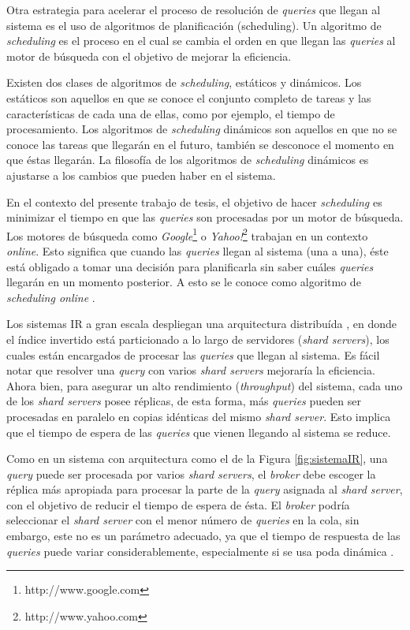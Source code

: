 Otra estrategia para acelerar el proceso de resolución de \textit{queries} que llegan al sistema es el uso de algoritmos de planificación (scheduling). Un algoritmo de \textit{scheduling} es el proceso en el cual se cambia el orden en que llegan las \textit{queries} al motor de búsqueda con el objetivo de mejorar la eficiencia. 

Existen dos clases de algoritmos de \textit{scheduling}, estáticos y dinámicos. Los estáticos son aquellos en que se conoce el conjunto completo de tareas y las características de cada una de ellas, como por ejemplo, el tiempo de procesamiento. Los algoritmos de \textit{scheduling} dinámicos son aquellos en que no se conoce las tareas que llegarán en el futuro, también se desconoce el momento en que éstas llegarán. La filosofía de los algoritmos de \textit{scheduling} dinámicos es ajustarse a los cambios que pueden haber en el sistema.

En el contexto del presente trabajo de tesis, el objetivo de hacer \textit{scheduling} es minimizar el tiempo en que las \textit{queries} son procesadas por un motor de búsqueda. Los motores de búsqueda como \textit{Google}\footnote{http://www.google.com} o \textit{Yahoo!}\footnote{http://www.yahoo.com} trabajan en un contexto \textit{online}. Esto significa que cuando las \textit{queries} llegan al sistema (una a una), éste está obligado a tomar una decisión para planificarla sin saber cuáles \textit{queries} llegarán en un momento posterior. A esto se le conoce como algoritmo de \textit{scheduling online} \citep{Albers:2003, Borodin:1998}.

Los sistemas IR a gran escala despliegan una arquitectura distribuída \citep{Dean:2009}, en donde el índice invertido está particionado \citep{Barroso:2003} a lo largo de servidores (\textit{shard servers}), los cuales están encargados de procesar las \textit{queries} que llegan al sistema. Es fácil notar que resolver una \textit{query} con varios \textit{shard servers} mejoraría la eficiencia. Ahora bien, para asegurar un alto rendimiento (\textit{throughput}) del sistema, cada uno de los \textit{shard servers} posee réplicas, de esta forma, más \textit{queries} pueden ser procesadas en paralelo en copias idénticas del mismo \textit{shard server}. Esto implica que el tiempo de espera de las \textit{queries} que vienen llegando al sistema se reduce. 

Como en un sistema con arquitectura como el de la Figura \ref{fig:sistemaIR}, una \textit{query} puede ser procesada por varios \textit{shard servers}, el \textit{broker} debe escoger la réplica más apropiada para procesar la parte de la \textit{query} asignada al \textit{shard server}, con el objetivo de reducir el tiempo de espera de ésta. El \textit{broker} podría seleccionar el \textit{shard server} con el menor número de \textit{queries} en la cola, sin embargo, este no es un parámetro adecuado, ya que el tiempo de respuesta de las \textit{queries} puede variar considerablemente, especialmente si se usa poda dinámica \citep{Broder:2003, Moffat:1996}. 


